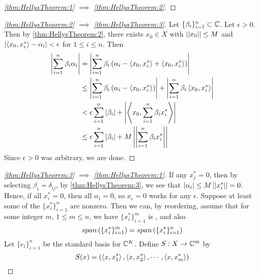 \begin{thm}
\begin{proof}[\ref{thm:HellysTheorem:1} $\implies$ \ref{thm:HellysTheorem:2}]
    \end{proof}
    \begin{proof}[\ref{thm:HellysTheorem:2} $\implies$ \ref{thm:HellysTheorem:3}]
        Let $\{\beta_i\}_{i=1}^n \subset \mathbb{C}$.
        Let $\epsilon > 0$. 
        Then by \ref{thm:HellysTheorem:2}, there exists 
        $x_{0} \in X$ with $\left|\left| x_0 \right|\right| \leq M$ and 
        $\left| \left\langle x_0, x_i^* \right\rangle -\alpha_i \right| < \epsilon$ for $1 \leq i \leq n$. 
        Then
        \begin{align*}
        \left| \sum\limits_{i=1}^n \beta_i \alpha_i \right| 
        & = \left| \sum\limits_{i=1}^n \beta_i \left( \alpha_i - \left\langle x_0, x_i^* \right\rangle+\left\langle x_0, x_i^* \right\rangle\right) \right|\\
        & \leq \left| \sum\limits_{i=1}^n \beta_i \left( \alpha_i - \left\langle x_0, x_i^* \right\rangle\right) \right|
        + \left| \sum\limits_{i=1}^n  \beta_i \left\langle x_0, x_i^* \right\rangle \right|\\
        & < \epsilon \sum\limits_{i=1}^n \left| \beta_i \right| 
        + \left|  \left\langle x_0, \sum\limits_{i=1}^n \beta_ix_i^* \right\rangle \right|\\
        & \leq \epsilon \sum\limits_{i=1}^n \left| \beta_i \right| 
        + M \left|\left| \sum\limits_{i=1}^n \beta_i x_i^* \right|\right|
        \end{align*}
        Since $\epsilon > 0$ was arbitrary, we are done.
    \end{proof} 
    \begin{proof}[\ref{thm:HellysTheorem:3} $\implies$ \ref{thm:HellysTheorem:1}]
        If any $x_j^*=0$, then by selecting $\beta_i= \delta_{ij}$, 
        by \ref{thm:HellysTheorem:3}, we see that $\left| \alpha_i \right| \leq M \left|\left| x_i^* \right|\right| =0$. 
        Hence, if all $x_i^*=0$, 
        then all $\alpha_i = 0$, so 
        $x_\epsilon = 0$ works for any $\epsilon$. 
        Suppose at least some of the $\{x_i^*\}_{i=1}^n$ are nonzero.
        Then we can, by reordering, assume that for some integer $m$, 
        $1 \leq m \leq n$, we have 
        $\{x_i^*\}_{i=1}^m$ is
        \LinearlyIndependent,
        and also 
        \begin{equation}
        \label{Eq:HellysTheorem:1}
        span \left( \{x_i^*\}_{i=1}^m\right)= span \left( \{x_i^*\}_{i=1}^n\right)
        \end{equation}
        Let $\{e_i\}_{i=1}^n$ be the standard basis for $\mathbb{C}^K$. 
        Define $S:X \to \mathbb{C}^m$ by 
        \begin{equation*}
        S(x) = \left( \left\langle x, x_1^* \right\rangle, \left\langle x, x_2^* \right\rangle, \cdots, \left\langle x, x_m^* \right\rangle\right)
        \end{equation*}

\end{proof}
\end{thm}
